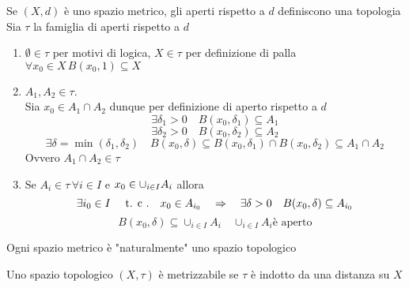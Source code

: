 \begin{prop}Se $(X,d)$ \`e uno spazio metrico, gli aperti rispetto a $d$  definiscono una topologia
\proof Sia $\tau$ la famiglia di aperti rispetto a $d$
\begin{enumerate}
	\item $\emptyset \in \tau$ per motivi di logica, $X\in \tau$ per definizione di palla $\forall x_0\in X \, B(x_0,1)\subseteq X $
	\item $A_1,A_2 \in \tau$.\\
		  Sia $x_0\in A_1\cap A_2 $ dunque per definizione di aperto rispetto a $d$
		  $$ \exists \delta_1 >0 \quad B(x_0, \delta_1) \subseteq A_1 $$
		  $$ \exists \delta_2 >0 \quad B(x_0, \delta_2) \subseteq A_2 $$
		  $$ \exists \delta=\min(\delta_1, \delta_2) \quad B(x_0,\delta)\subseteq B(x_0,\delta_1)\cap B(x_0,\delta_2)\subseteq A_1\cap A_2$$
		  Ovvero $A_1\cap A_2 \in \tau$
	\item Se $A_i \in \tau \, \forall i \in I $ e $ \displaystyle x_0\in \cup_{i\in I} A_i$ allora 
	$$ \exists i_0 \in I \quad \text{ t. c .} \quad x_0 \in A_{i_0} \quad \Rightarrow \quad \exists \delta>0 \quad B(x_0, \delta )\subseteq A_{i_0}$$
	$$B(x_0,\delta) \subseteq \cup_{i\in I} A_i \quad \cup_{i\in I} A_i \text{\`e aperto}$$ 
\end{enumerate}
\endproof
\begin{oss}
Ogni spazio metrico \`e "naturalmente" uno spazio topologico	
\end{oss}
\end{prop}
\begin{defn}
Uno spazio topologico $(X,\tau)$ \`e metrizzabile se $\tau$ \`e indotto da una distanza su $X$	
\end{defn}

